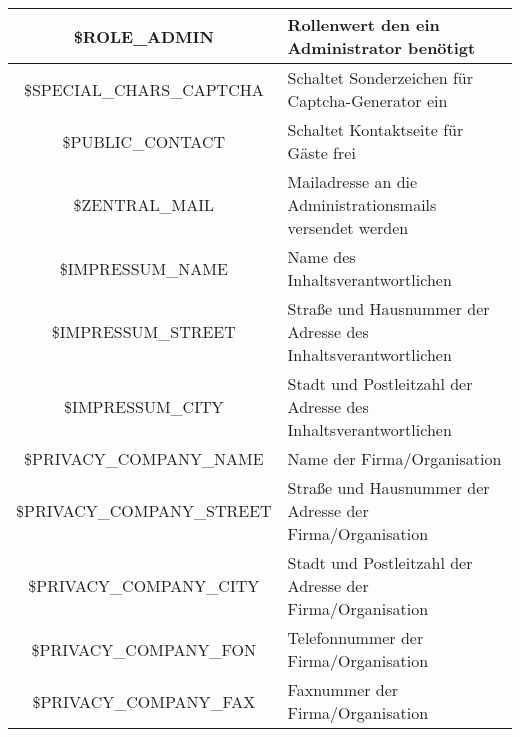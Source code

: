 \begin{longtable}[H]{|c|p{8cm}|}
	\$ROLE\_ADMIN             & Rollenwert den ein Administrator benötigt                                                                                                    \\ \hline	
	\$SPECIAL\_CHARS\_CAPTCHA & Schaltet Sonderzeichen für Captcha-Generator ein                                                                                                     \\ \hline	
	\$PUBLIC\_CONTACT         & Schaltet Kontaktseite für Gäste frei                                                                                                     \\ \hline	
	\$ZENTRAL\_MAIL			  & Mailadresse an die Administrationsmails versendet werden                                                                                                     \\ \hline		
	\$IMPRESSUM\_NAME         & Name des Inhaltsverantwortlichen                                                                                                     \\ \hline
	\$IMPRESSUM\_STREET       & Straße und Hausnummer der Adresse des Inhaltsverantwortlichen                                                                                                     \\ \hline	
	\$IMPRESSUM\_CITY         & Stadt und Postleitzahl der Adresse des Inhaltsverantwortlichen                                                                                                     \\ \hline	
	\$PRIVACY\_COMPANY\_NAME  & Name der Firma/Organisation                                                                                                     \\ \hline
	\$PRIVACY\_COMPANY\_STREET & Straße und Hausnummer der Adresse der Firma/Organisation                                                                                                     \\ \hline	
	\$PRIVACY\_COMPANY\_CITY   & Stadt und Postleitzahl der Adresse der Firma/Organisation                                                                                                     \\ \hline	
	\$PRIVACY\_COMPANY\_FON    & Telefonnummer der Firma/Organisation                                                                                                     \\ \hline	
	\$PRIVACY\_COMPANY\_FAX    & Faxnummer der Firma/Organisation                                                                                                     \\ \hline	

\end{longtable}
